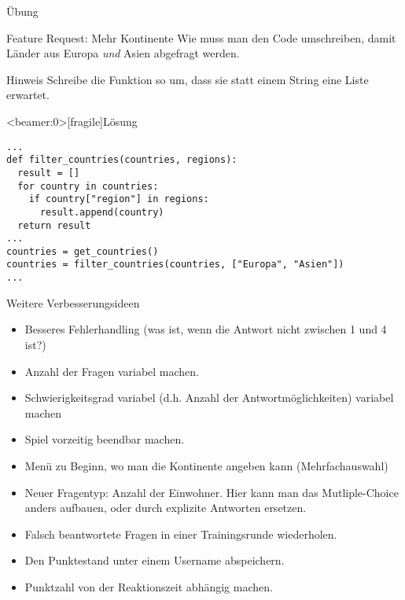 \begin{frame}{Übung}
\begin{block}{Feature Request: Mehr Kontinente}
\vspace{2pt}
Wie muss man den Code umschreiben, damit Länder aus Europa \emph{und} Asien abgefragt werden.
\end{block}


\pause

\vspace{12pt}

\begin{exampleblock}{Hinweis}
	\vspace{2pt}
Schreibe die Funktion  so um, dass sie statt einem String  eine Liste  erwartet. 
\end{exampleblock}

\end{frame}

\begin{frame}<beamer:0>[fragile]{Lösung}
	
\begin{solutionblock}{}
\begin{verbatim}
...
def filter_countries(countries, regions):
  result = []
  for country in countries:
    if country["region"] in regions:
      result.append(country)
  return result
...
countries = get_countries()
countries = filter_countries(countries, ["Europa", "Asien"])
...
\end{verbatim}
\end{solutionblock}
\end{frame}


\begin{frame}
\begin{block}{Weitere Verbesserungsideen}
	\pause 
\begin{itemize}[<+->]
  \item Besseres Fehlerhandling (was ist, wenn die Antwort nicht zwischen 1 und 4 ist?)
  \item Anzahl der Fragen variabel machen. 
  \item Schwierigkeitsgrad variabel (d.h. Anzahl der Antwortmöglichkeiten) variabel machen
  \item Spiel vorzeitig beendbar machen. 
  \item Menü zu Beginn, wo man die Kontinente angeben kann (Mehrfachauswahl)
  \item Neuer Fragentyp: Anzahl der Einwohner. Hier kann man das Mutliple-Choice anders aufbauen, oder durch explizite Antworten ersetzen. 
  \item Falsch beantwortete Fragen in einer Trainingsrunde wiederholen.  
  \item Den Punktestand unter einem Username abspeichern.
  \item Punktzahl von der Reaktionszeit abhängig machen. 
\end{itemize}
\end{block}
\end{frame}


